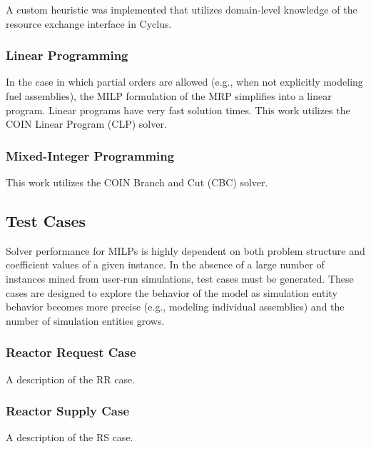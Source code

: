A custom heuristic was implemented that utilizes domain-level knowledge of the
resource exchange interface in Cyclus.

\subsubsection{Linear Programming}

In the case in which partial orders are allowed (e.g., when not explicitly
modeling fuel assemblies), the MILP formulation of the MRP simplifies into a
linear program. Linear programs have very fast solution times. This work
utilizes the COIN Linear Program (CLP) solver.

\subsubsection{Mixed-Integer Programming}

This work utilizes the COIN Branch and Cut (CBC) solver. 

\subsection{Test Cases}

Solver performance for MILPs is highly dependent on both problem structure and
coefficient values of a given instance. In the absence of a large number of
instances mined from user-run simulations, test cases must be generated. These
cases are designed to explore the behavior of the model as simulation entity
behavior becomes more precise (e.g., modeling individual assemblies) and the
number of simulation entities grows.

\subsubsection{Reactor Request Case}

A description of the RR case.

\subsubsection{Reactor Supply Case}

A description of the RS case.
